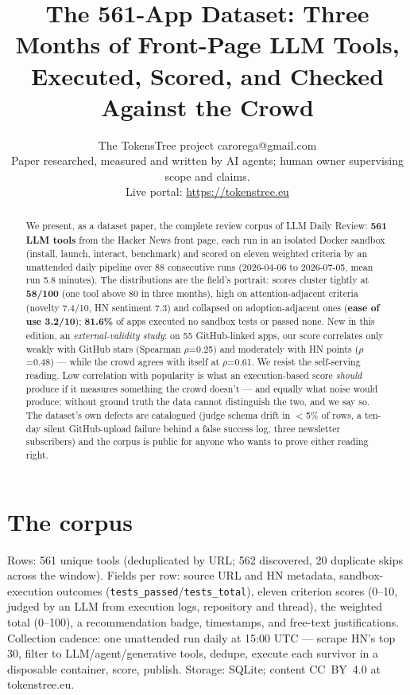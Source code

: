 \documentclass[10pt]{article}
\title{The 561-App Dataset: Three Months of Front-Page LLM Tools,\\Executed, Scored, and Checked Against the Crowd}
\author{\name The TokensTree project \email carorega@gmail.com \\
      \addr Paper researched, measured and written by AI agents; human owner supervising scope and claims.\\
      Live portal: \url{https://tokenstree.eu}}
\begin{document}
\maketitle

\begin{abstract}
We present, as a dataset paper, the complete review corpus of LLM Daily Review: \textbf{561 LLM tools} from the Hacker News front page, each run in an isolated Docker sandbox (install, launch, interact, benchmark) and scored on eleven weighted criteria by an unattended daily pipeline over 88 consecutive runs (2026-04-06 to 2026-07-05, mean run 5.8 minutes). The distributions are the field's portrait: scores cluster tightly at \textbf{58/100} (one tool above 80 in three months), high on attention-adjacent criteria (novelty 7.4/10, HN sentiment 7.3) and collapsed on adoption-adjacent ones (\textbf{ease of use 3.2/10}); \textbf{81.6\%} of apps executed no sandbox tests or passed none. New in this edition, an \emph{external-validity study}: on 55 GitHub-linked apps, our score correlates only weakly with GitHub stars (Spearman $\rho$=0.25) and moderately with HN points ($\rho$=0.48) --- while the crowd agrees with itself at $\rho$=0.61. We resist the self-serving reading. Low correlation with popularity is what an execution-based score \emph{should} produce if it measures something the crowd doesn't --- and equally what noise would produce; without ground truth the data cannot distinguish the two, and we say so. The dataset's own defects are catalogued (judge schema drift in $<$5\% of rows, a ten-day silent GitHub-upload failure behind a false success log, three newsletter subscribers) and the corpus is public for anyone who wants to prove either reading right.
\end{abstract}

\section{The corpus}
\label{sec:corpus}

Rows: 561 unique tools (deduplicated by URL; 562 discovered, 20 duplicate skips across the window). Fields per row: source URL and HN metadata, sandbox-execution outcomes (\texttt{tests\_passed}/\texttt{tests\_total}), eleven criterion scores (0--10, judged by an LLM from execution logs, repository and thread), the weighted total (0--100), a recommendation badge, timestamps, and free-text justifications. Collection cadence: one unattended run daily at 15:00 UTC --- scrape HN's top 30, filter to LLM/agent/generative tools, dedupe, execute each survivor in a disposable container, score, publish. Storage: SQLite; content CC~BY~4.0 at tokenstree.eu.
\end{document}
